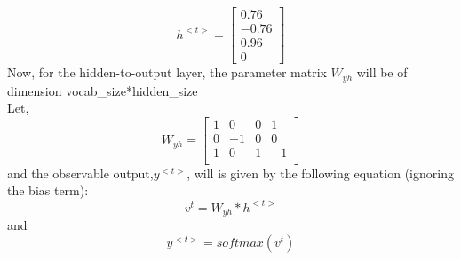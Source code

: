 \documentclass[12pt,letterpaper]{article}
\begin{document}
\[
h^{<t>} = \begin{bmatrix}
0.76\\
-0.76\\
0.96\\
0
\end{bmatrix}
\]
Now, for the hidden-to-output layer,
the parameter matrix $W_{yh}$ will be of dimension vocab\_size*hidden\_size\\
Let,
\[
W_{yh} = \begin{bmatrix}
1&0&0&1\\
0&-1&0&0\\
1&0&1&-1\\
\end{bmatrix}
\]
and the observable output,$y^{<t>}$, will is given by the following equation (ignoring the bias term):
\[
v^{t} = W_{yh}*h^{<t>}
\]
and
\[
y^{<t>} = softmax(v^{t})
\]
\end{document}

